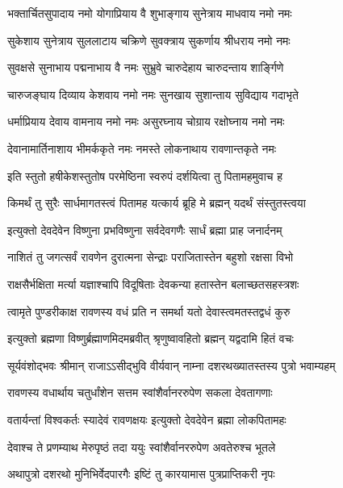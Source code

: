 \twolineshloka
{भक्तार्चितसुपादाय नमो योगाप्रियाय वै}
{शुभाङ्गाय सुनेत्राय माधवाय नमो नमः} %

\twolineshloka
{सुकेशाय सुनेत्राय सुललाटाय चक्रिणे}
{सुवक्त्राय सुकर्णाय श्रीधराय नमो नमः} %

\twolineshloka
{सुवक्षसे सुनाभाय पद्मनाभाय वै नमः}
{सुभ्रुवे चारुदेहाय चारुदन्ताय शार्ङ्गिणे} %

\twolineshloka
{चारुजङ्घाय दिव्याय केशवाय नमो नमः}
{सुनखाय सुशान्ताय सुविद्याय गदाभृते} %

\twolineshloka
{धर्माप्रियाय देवाय वामनाय नमो नमः}
{असुरघ्नाय चोग्राय रक्षोघ्नाय नमो नमः} %

\twolineshloka
{देवानामार्तिनाशाय भीमर्ककृते नमः}
{नमस्ते लोकनाथाय रावणान्तकृते नमः} %


\twolineshloka
{इति स्तुतो हषीकेशस्तुतोष परमेष्ठिना}
{स्वरुपं दर्शयित्वा तु पितामहमुवाच ह} %

\twolineshloka
{किमर्थं तु सुरैः सार्धमागतस्त्वं पितामह}
{यत्कार्य ब्रूहि मे ब्रह्मन् यदर्थं संस्तुतस्त्वया} %

\twolineshloka
{इत्युक्तो देवदेवेन विष्णुना प्रभविष्णुना}
{सर्वदेवगणैः सार्धं ब्रह्मा प्राह जनार्दनम्} %


\twolineshloka
{नाशितं तु जगत्सर्वं रावणेन दुरात्मना}
{सेन्द्राः पराजितास्तेन बहुशो रक्षसा विभो} %

\twolineshloka
{राक्षसैर्भक्षिता मर्त्या यज्ञाश्चापि विदूषिताः}
{देवकन्या हतास्तेन बलाच्छतसहस्त्रशः} %

\twolineshloka
{त्वामृते पुण्डरीकाक्ष रावणस्य वधं प्रति}
{न समर्था यतो देवास्त्वमतस्तद्वधं कुरु} %

\twolineshloka
{इत्युक्तो ब्रह्मणा विष्णुर्ब्रह्माणमिदमब्रवीत्}
{श्रृणुष्वावहितो ब्रह्मन् यद्वदामि हितं वचः} %

\twolineshloka
{सूर्यवंशोद्भवः श्रीमान् राजाऽऽसीद्भुवि वीर्यवान्}
{नाम्ना दशरथख्यातस्तस्य पुत्रो भवाम्यहम्} %

\twolineshloka
{रावणस्य वधार्थाय चतुर्धांशेन सत्तम}
{स्वांशैर्वानररुपेण सकला देवतागणाः} %

\twolineshloka
{वतार्यन्तां विश्वकर्तः स्यादेवं रावणक्षयः}
{इत्युक्तो देवदेवेन ब्रह्मा लोकपितामहः} %

\twolineshloka
{देवाश्च ते प्रणम्याथ मेरुपृष्ठं तदा ययुः}
{स्वांशैर्वानररुपेण अवतेरुश्च भूतले} %

\twolineshloka
{अथापुत्रो दशरथो मुनिभिर्वेदपारगैः}
{इष्टिं तु कारयामास पुत्रप्राप्तिकरी नृपः} %

